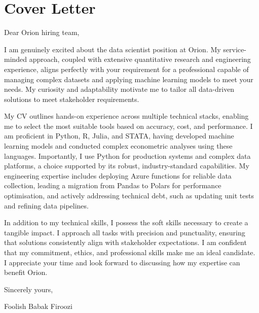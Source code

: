 \documentclass[a4paper,11pt]{article}
\begin{document}
	
	

	\section{Cover Letter}



Dear Orion hiring team,

I am genuinely excited about the data scientist position at Orion. My service-minded approach, coupled with extensive quantitative research and engineering experience, aligns perfectly with your requirement for a professional capable of managing complex datasets and applying machine learning models to meet your needs. My curiosity and adaptability motivate me to tailor all data-driven solutions to meet stakeholder requirements.

My CV outlines hands-on experience across multiple technical stacks, enabling me to select the most suitable tools based on accuracy, cost, and performance. I am proficient in Python, R, Julia, and STATA, having developed machine learning models and conducted complex econometric analyses using these languages. Importantly, I use Python for production systems and complex data platforms, a choice supported by its robust, industry-standard capabilities. My engineering expertise includes deploying Azure functions for reliable data collection, leading a migration from Pandas to Polars for performance optimisation, and actively addressing technical debt, such as updating unit tests and refining data pipelines. 

In addition to my technical skills, I possess the soft skills necessary to create a tangible impact. I approach all tasks with precision and punctuality, ensuring that solutions consistently align with stakeholder expectations. I am confident that my commitment, ethics, and professional skills make me an ideal candidate. I appreciate your time and look forward to discussing how my expertise can benefit Orion.

Sincerely yours,

Foolish Babak Firoozi
	
\end{document}
